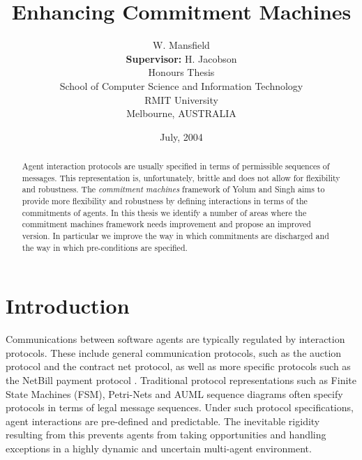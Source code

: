 \documentclass[11pt,a4paper,twoside]{article}
\newcommand{\student}{W. Mansfield}
\newcommand{\topic}{Enhancing Commitment Machines}
\begin{document}
\title{{\sc \topic}}
\author{{\sc \student}
	\\[3mm] {\bf Supervisor:} {\sc H. Jacobson}
	\\[5mm] Honours Thesis
	\\[5mm] School of Computer Science and Information Technology
	\\ RMIT University 
	\\ Melbourne, AUSTRALIA
} 
\date{July, 2004}

\maketitle

\begin{abstract}
Agent interaction protocols are usually specified in terms of permissible
sequences of messages. This representation is, unfortunately, brittle and does
not allow for flexibility and robustness.  The {\em commitment machines}
framework of Yolum and Singh aims to provide more flexibility and robustness by
defining interactions in terms of the commitments of agents.  In this thesis we
identify a number of areas where the commitment machines framework needs
improvement and propose an improved version.
In particular we improve the
way in which commitments are discharged and the way in which pre-conditions are specified. 
\end{abstract}


\newpage

\tableofcontents

\newpage

\pagestyle{fancy}


\newcommand{\offer}{\mathit{offer}}
\newcommand{\C}{\mathsf{C}}
\newcommand{\CC}{\mathsf{CC}}
\newcommand{\CP}{\mathsf{CP}}

\section{Introduction}

Communications between software agents are typically regulated by interaction
protocols. These include general communication protocols, such as  the auction
protocol and the contract net protocol, as well as more specific protocols such as
the NetBill payment protocol \citep{mi:handbook03,mi:article:dunham}. 
Traditional protocol
representations such as Finite State Machines (FSM), Petri-Nets
\citep{mi:inproc:hmine} and AUML sequence diagrams 
often specify protocols in terms of legal message sequences.  Under such
protocol specifications, agent interactions are pre-defined and predictable. The
inevitable rigidity resulting from this prevents agents from taking
opportunities and handling exceptions in a highly dynamic and uncertain
multi-agent environment.
\end{document}
